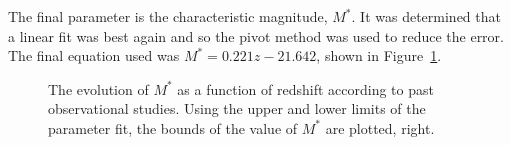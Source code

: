 			The final parameter is the characteristic magnitude, $M^*$. It was determined that a linear fit was best again and so the pivot method was used to reduce the error. The final equation used was $M^* = 0.221z - 21.642$, shown in Figure~\ref{fig:m-star_evolution}.
			\begin{figure}[htbp]
				\begin{minipage}[c]{0.5\linewidth}
					\centering
						\begingroup{}
							\resizebox{\textwidth}{!}{%
								
							}\endgroup
				\end{minipage}
				\begin{minipage}[c]{0.5\linewidth}
					\centering
						\begingroup{}
							\resizebox{\textwidth}{!}{%
								
							}\endgroup
				\end{minipage}
				\caption{The evolution of $M^{*}$ as a function of redshift according to past observational studies. Using the upper and lower limits of the parameter fit, the bounds of the value of $M^*$ are plotted, right.\label{fig:m-star_evolution}}
			\end{figure}

